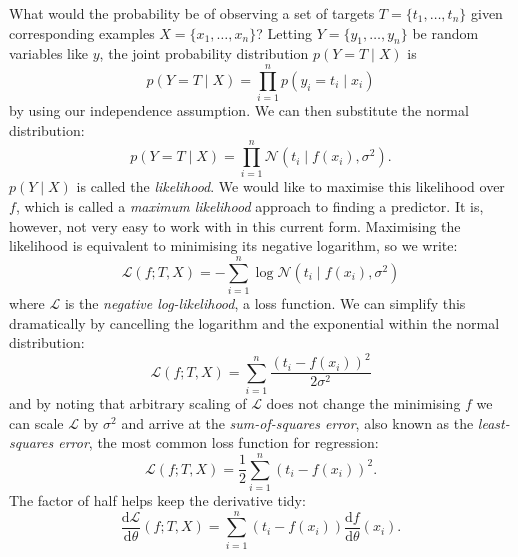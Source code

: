 \documentclass[11pt, a4paper]{book}
\newcommand{\defn}[1]{\emph{#1}}
\begin{document}
            What would the probability be of observing a set of targets $T = \{t_1, \dots, t_n\}$ given corresponding examples $X = \{x_1, \dots, x_n\}$? Letting $Y = \{y_1, \dots, y_n\}$ be random variables like $y$, the joint probability distribution $p(Y = T \mid X)$ is
            \begin{equation}
                p(Y = T \mid X) = \prod_{i = 1}^n p(y_i = t_i \mid x_i)
            \end{equation}
            by using our independence assumption. We can then substitute the normal distribution:
            \begin{equation}
                p(Y = T \mid X) = \prod_{i = 1}^n \mathcal N(t_i \mid f(x_i), \sigma^2).
            \end{equation}
            $p(Y \mid X)$ is called the \defn{likelihood}. We would like to maximise this likelihood over $f$, which is called a \defn{maximum likelihood} approach to finding a predictor. It is, however, not very easy to work with in this current form. Maximising the likelihood is equivalent to minimising its negative logarithm, so we write:
            \begin{equation}
                \mathcal L(f; T, X) = -\sum_{i = 1}^n \log \mathcal N(t_i \mid f(x_i), \sigma^2)
            \end{equation}
            where $\mathcal L$ is the \defn{negative log-likelihood}, a loss function. We can simplify this dramatically by cancelling the logarithm and the exponential within the normal distribution:
            \begin{equation}
                \mathcal L(f; T, X) = \sum_{i = 1}^n \frac{(t_i - f(x_i))^2}{2\sigma^2}
            \end{equation}
        and by noting that arbitrary scaling of $\mathcal L$ does not change the minimising $f$ we can scale $\mathcal L$ by $\sigma^2$ and arrive at the \defn{sum-of-squares error}, also known as the \defn{least-squares error}, the most common loss function for regression:
            \begin{equation}
                \mathcal L(f; T, X) = \frac{1}{2} \sum_{i = 1}^n (t_i - f(x_i))^2.
            \end{equation}
            The factor of half helps keep the derivative tidy:
            \begin{equation}
                \frac{\mathrm{d}\mathcal L}{\mathrm{d}\theta}(f; T, X) = \sum_{i = 1}^n (t_i - f(x_i)) \frac{\mathrm{d}f}{\mathrm{d}\theta}(x_i).
            \end{equation}
\end{document}
